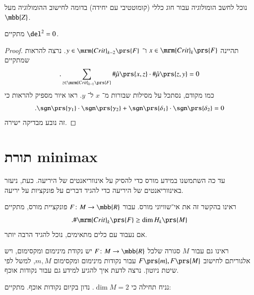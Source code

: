 \documentclass[a4paper,10pt,twoside,openany]{book}
\begin{document}
\begin{remark}
נוכל לחשב הומולוגיה עבור חוג כללי (קומוטטיבי עם יחידה) בדומה לחישוב ההומולוגיה מעל
$\mbb{Z}$.
\end{remark}

\begin{proposition}
מתקיים
$\del^2 = 0$.
\end{proposition}

\begin{proof}
תהיינה
$x \in \mrm{Crit}_k\prs{F}$
ו־%
$y \in \mrm{Crit}_{k-2}\prs{F}$.
נרצה להראות שמתקיים
\[\text{.} \sum_{z \in \mrm{Crit}_{k-1} \prs{F}} \# \hat{\mu}\prs{x,z} \cdot \# \hat{\mu}\prs{z,y} = 0\]
כמו מקודם, נסתכל על מסילות שבורות מ־%
$x$
ל־%
$y$.
ראו איור
מספיק להראות כי
\[\text{.} \sgn\prs{\gamma_1} \cdot \sgn\prs{\gamma_2} + \sgn\prs{\delta_1} \cdot \sgn\prs{\delta_2} = 0\]
זה נובע מבדיקה ישירה.
\end{proof}

\chapter{תורת \textenglish{minimax}}

עד כה השתמשנו במידע מורס כדי להסיק על אינווריאנטים של היריעה. כעת, ניעזר באינווריאנטים של היריעה כדי להגיד דברים על פונקציות על יריעה.

ראינו בהקשר זה את אי־שוויוני מורס. עבור
$F \colon M \to \mbb{R}$
פונקציית מורס, מתקיים
\[\text{.} \# \mrm{Crit}_k\prs{F} \geq \dim H_k\prs{M}\]
אם נעבוד עם כלים מתאימים, נוכל להגיד הרבה יותר.

ראינו גם עבור
$M$
סגורה שלכל
$F \colon M \to \mbb{R}$
יש נקודת מינימום ומקסימום, ויש אלגוריתם לחישוב
$F\prs{m}, F\prs{M}$
עבור נקודות מינימום ומקסימום
$m,M$,
למשל לפי שיטת ניוטון.
נרצה לדעת איך להגיע למידע גם עבור נקודות אוכף.

נניח תחילה כי
$\dim M = 2$.
נדון בקיום נקודות אוכף. מתקיים:
\end{document}
